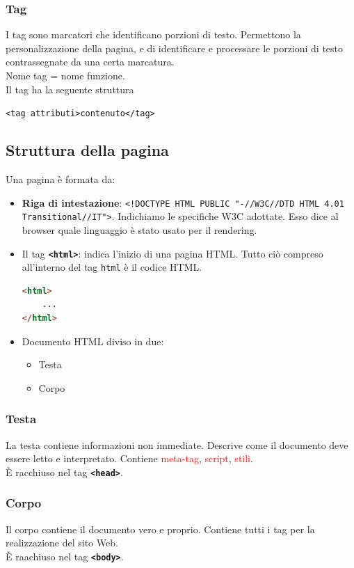 \documentclass{article}
\begin{document}
\subsubsection{Tag}
I tag sono marcatori che identificano porzioni di testo. Permettono la personalizzazione della pagina, e di identificare e processare le porzioni di testo contrassegnate da una certa marcatura.
\\ Nome tag = nome funzione.
\\ Il tag ha la seguente struttura
\begin{center}
\texttt{<tag attributi>contenuto</tag>}
\end{center}
\subsection{Struttura della pagina}
Una pagina è formata da:
\begin{itemize}
    \item \textbf{Riga di intestazione}: \texttt{<!DOCTYPE HTML PUBLIC "-//W3C//DTD HTML 4.01
Transitional//IT">}. Indichiamo le specifiche W3C adottate. Esso dice al browser quale linguaggio è stato usato per il rendering.
    \item Il tag \textbf{\texttt{<html>}}: indica l'inizio di una pagina HTML. Tutto ciò compreso all'interno del tag \texttt{html} è il codice HTML.   
\begin{lstlisting}[language=HTML]
<html>
    ...
</html>
\end{lstlisting}
\item Documento HTML diviso in due:
\begin{itemize}
    \item Testa
    \item Corpo
\end{itemize}
\end{itemize}

\subsubsection{Testa}
La testa contiene informazioni non immediate. Descrive come il documento deve essere letto e interpretato. Contiene \textcolor{red}{meta-tag}, \textcolor{red}{script}, \textcolor{red}{stili}.
\\ È racchiuso nel tag \texttt{\textbf{<head>}}.
\subsubsection{Corpo}
Il corpo contiene il documento vero e proprio. Contiene tutti i tag per la realizzazione del sito Web. 
\\ È raachiuso nel tag \texttt{\textbf{<body>}}.
\end{document}

